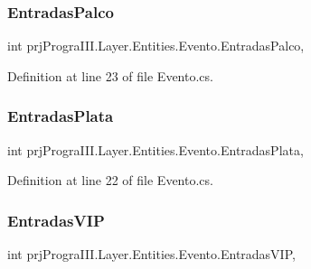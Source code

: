 \subsubsection{\texorpdfstring{Entradas\+Palco}{EntradasPalco}}
{\footnotesize\ttfamily int prj\+Progra\+I\+I\+I.\+Layer.\+Entities.\+Evento.\+Entradas\+Palco\hspace{0.3cm}{\ttfamily [get]}, {\ttfamily [set]}}



Definition at line 23 of file Evento.\+cs.

\hypertarget{classprj_progra_i_i_i_1_1_layer_1_1_entities_1_1_evento_aa2fca6211711f200359dc77522fbadc8}{}\label{classprj_progra_i_i_i_1_1_layer_1_1_entities_1_1_evento_aa2fca6211711f200359dc77522fbadc8} 
\subsubsection{\texorpdfstring{Entradas\+Plata}{EntradasPlata}}
{\footnotesize\ttfamily int prj\+Progra\+I\+I\+I.\+Layer.\+Entities.\+Evento.\+Entradas\+Plata\hspace{0.3cm}{\ttfamily [get]}, {\ttfamily [set]}}



Definition at line 22 of file Evento.\+cs.

\hypertarget{classprj_progra_i_i_i_1_1_layer_1_1_entities_1_1_evento_af3f6f0f3512e0cc4dd0f24f4dd173b16}{}\label{classprj_progra_i_i_i_1_1_layer_1_1_entities_1_1_evento_af3f6f0f3512e0cc4dd0f24f4dd173b16} 
\subsubsection{\texorpdfstring{Entradas\+V\+IP}{EntradasVIP}}
{\footnotesize\ttfamily int prj\+Progra\+I\+I\+I.\+Layer.\+Entities.\+Evento.\+Entradas\+V\+IP\hspace{0.3cm}{\ttfamily [get]}, {\ttfamily [set]}}




